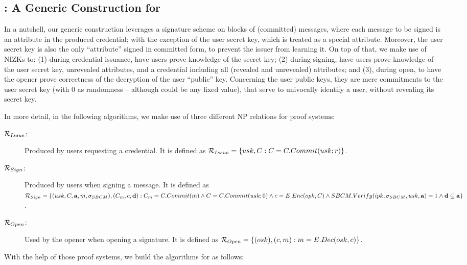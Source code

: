 \subsection{\GSACGen: A Generic Construction for \GSAC}
\label{ssec:generic-gsac}

In a nutshell, our generic \GSAC construction leverages a signature scheme
on blocks of (committed) messages, where each message to be signed is an
attribute in the produced credential; with the exception of the user secret key,
which is treated as a special attribute. Moreover, the user secret key is also
the only ``attribute'' signed in committed form, to prevent the issuer from
learning it. On top of that, we make use of NIZKs to: (1) during credential
issuance, have users prove knowledge of the secret key; (2) during signing,
have users prove knowledge of the user secret key, unrevealed attributes, and
a credential including all (revealed and unrevealed) attributes; and (3), during
open, to have the opener prove correctness of the decryption of the user
``public'' key. Concerning the user public keys, they are mere commitments to
the user secret key (with $0$ as randomness -- although could be any fixed
value), that serve to univocally identify a user, without revealing its secret
key.

In more detail, in the following algorithms, we make use of three different NP
relations for \NIZK proof systems:

\begin{description}
\item[$\mathcal{R}_{Issue}$:] Produced by users requesting a credential. It is
  defined as $\mathcal{R}_{Issue} = \lbrace usk, C :
  C = C.Commit(usk; r) \rbrace$.
\item[$\mathcal{R}_{Sign}$:] Produced by users when signing a message. It is
  defined as $\mathcal{R}_{Sign} = \lbrace (usk,C,\mathbf{a},m,\sigma_{SBCM}),
  (C_{m},c,\mathbf{d}) : C_{m} = C.Commit(m) \land C =
  C.Commit(usk; 0) \land c = E.Enc(opk,C)
  \land SBCM.Verify(ipk,\sigma_{SBCM},usk,\mathbf{a}) = 1
  \land \mathbf{d} \subseteq \mathbf{a} \rbrace$.
\item[$\mathcal{R}_{Open}$:] Used by the opener when opening a signature. It
  is defined as $\mathcal{R}_{Open} = \lbrace (osk), (c,m) :
  m = E.Dec(osk,c) \rbrace$.
\end{description}

With the help of those \NIZK proof systems, we build the algorithms for
\GSACGen as follows:

